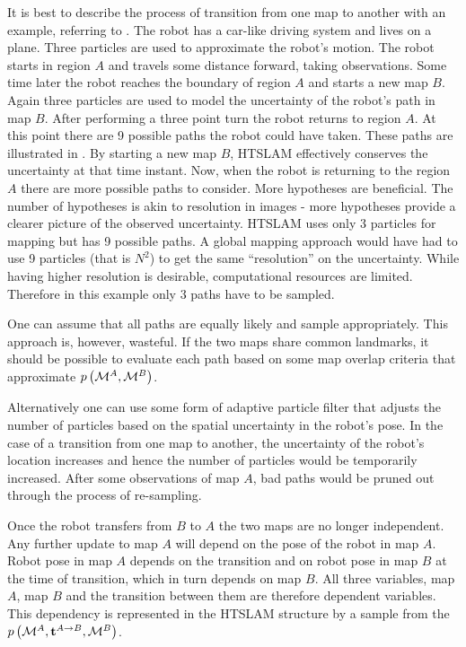It is best to describe the process of transition from one map to
another with an example, referring to
. The robot has a car-like driving
system and lives on a plane. Three particles are used to approximate
the robot's motion. The robot starts in region $A$ and travels some
distance forward, taking observations. Some time later the robot
reaches the boundary of region $A$ and starts a new map $B$. Again
three particles are used to model the uncertainty of the robot's path
in map $B$. After performing a three point turn the robot returns to
region $A$. At this point there are 9 possible paths the robot could
have taken. These paths are illustrated in
. By starting a new map $B$, HTSLAM
effectively conserves the uncertainty at that time instant. Now, when
the robot is returning to the region $A$ there are more possible paths
to consider. More hypotheses are beneficial. The number of hypotheses
is akin to resolution in images - more hypotheses provide a clearer
picture of the observed uncertainty. HTSLAM uses only 3 particles for
mapping but has 9 possible paths. A global mapping approach would have
had to use 9 particles (that is $N^2$) to get the same ``resolution''
on the uncertainty. While having higher resolution is desirable,
computational resources are limited. Therefore in this example only 3
paths have to be sampled.

One can assume that all paths are equally likely and sample
appropriately. This approach is, however, wasteful. If the two maps
share common landmarks, it should be possible to evaluate each path
based on some map overlap criteria that approximate
$\prob{\mapA,\mapB}$.

Alternatively one can use some form of adaptive particle filter
\cite{KLDSampling} that adjusts the number of particles
based on the spatial uncertainty in the robot's pose. In the case of a
transition from one map to another, the uncertainty of the robot's
location increases and hence the number of particles would be
temporarily increased. After some observations of map $A$, bad paths
would be pruned out through the process of re-sampling. 


Once the robot transfers from $B$ to $A$ the two maps are no longer
independent. Any further update to map $A$ will depend on the pose of
the robot in map $A$. Robot pose in map $A$ depends on the transition
and on robot pose in map $B$ at the time of transition, which in turn
depends on map $B$. All three variables, map $A$, map $B$ and the
transition between them are therefore dependent variables. This
dependency is represented in the HTSLAM structure by a sample from the
$\prob{\mapA,\tr{}{A}{B},\mapB}$.


